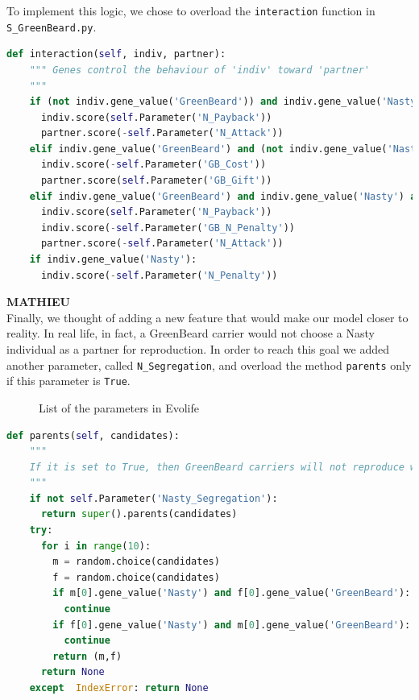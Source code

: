 \documentclass[12pt,a4paper]{article}
\newcommand{\M}{\textbf{MATHIEU}\\}
\begin{document}
\noindent To implement this logic, we chose to overload the \texttt{interaction} function in \texttt{S\_GreenBeard.py}.
\begin{lstlisting}[language=Python, caption=Overloading of \texttt{interaction} function]
  def interaction(self, indiv, partner):
    """ Genes control the behaviour of 'indiv' toward 'partner'
    """
    if (not indiv.gene_value('GreenBeard')) and indiv.gene_value('Nasty') and partner.gene_value('GreenBeard'):
      indiv.score(self.Parameter('N_Payback'))
      partner.score(-self.Parameter('N_Attack'))
    elif indiv.gene_value('GreenBeard') and (not indiv.gene_value('Nasty')) and partner.gene_value('GreenBeard'):
      indiv.score(-self.Parameter('GB_Cost'))
      partner.score(self.Parameter('GB_Gift'))
    elif indiv.gene_value('GreenBeard') and indiv.gene_value('Nasty') and partner.gene_value('GreenBeard'):
      indiv.score(self.Parameter('N_Payback'))
      indiv.score(-self.Parameter('GB_N_Penalty'))
      partner.score(-self.Parameter('N_Attack'))
    if indiv.gene_value('Nasty'):
      indiv.score(-self.Parameter('N_Penalty'))
\end{lstlisting}

\M
Finally, we thought of adding a new feature that would make our model closer to reality. In real life, in fact, a GreenBeard carrier would not choose a Nasty individual as a partner for reproduction.
In order to reach this goal we added another parameter, called \texttt{N\_Segregation}, and overload the method \texttt{parents} only if this parameter is \texttt{True}.

\begin{figure}[h]
    \centering
    \caption{\label{fig:4} List of the parameters in Evolife}
\end{figure}

\begin{lstlisting}[language=Python, caption=Overloading of \texttt{parents} function]
  def parents(self, candidates):
    """
    If it is set to True, then GreenBeard carriers will not reproduce with nasty carriers.
    """
    if not self.Parameter('Nasty_Segregation'):
      return super().parents(candidates)
    try:  
      for i in range(10):
        m = random.choice(candidates)
        f = random.choice(candidates)
        if m[0].gene_value('Nasty') and f[0].gene_value('GreenBeard'):
          continue
        if f[0].gene_value('Nasty') and m[0].gene_value('GreenBeard'):
          continue
        return (m,f)
      return None
    except  IndexError: return None
\end{lstlisting}
\end{document}

